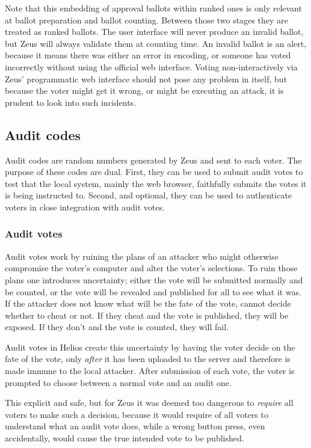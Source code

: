 \documentclass[letterpaper,10pt]{article}
\begin{document}
Note that this embedding of approval ballots within ranked ones is
only relevant at ballot preparation and ballot counting.
Between those two stages they are treated as ranked ballots.
The user interface will never produce an invalid ballot,
but Zeus will always validate them at counting time.
An invalid ballot is an alert, because it means there was either
an error in encoding, or someone has voted incorrectly without using
the official web interface.
Voting non-interactively via Zeus' programmatic web interface
should not pose any problem in itself,
but because the voter might get it wrong,
or might be executing an attack,
it is prudent to look into such incidents.

\subsection{Audit codes}
\label{sec:audit_codes}
Audit codes are random numbers generated by Zeus and sent to each voter.
The purpose of these codes are dual.
First, they can be used to submit audit votes to test that the local
system, mainly the web browser, faithfully submits the votes it is
being instructed to.
Second, and optional, they can be used to authenticate voters in close
integration with audit votes.

\subsubsection{Audit votes}
\label{sec:audit_votes}
Audit votes work by ruining the plans of an attacker who might otherwise
compromise the voter's computer and alter the voter's selections.
To ruin those plans one introduces uncertainty;
either the vote will be submitted normally and be counted,
or the vote will be revealed and published for all to see what it was.
If the attacker does not know what will be the fate of the vote,
cannot decide whether to cheat or not.
If they cheat and the vote is published, they will be exposed.
If they don't and the vote is counted, they will fail.

Audit votes in Helios create this uncertainty by having the voter decide
on the fate of the vote, only \emph{after} it has been uploaded to the
server and therefore is made immune to the local attacker.
After submission of each vote, the voter is prompted to choose
between a normal vote and an audit one.

This explicit and safe, but for Zeus it was deemed too dangerous to
\emph{require} all voters to make such a decision, because it would
require of all voters to understand what an audit vote does,
while a wrong button press, even accidentally,
would cause the true intended vote to be published.
\end{document}
